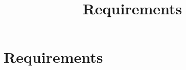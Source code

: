 \documentclass{projdoc}
\title{Requirements}
\begin{document}
\tablestables
\newpage

\section{Requirements}
\begin{multicols}{2}

\end{multicols}
\end{document}
